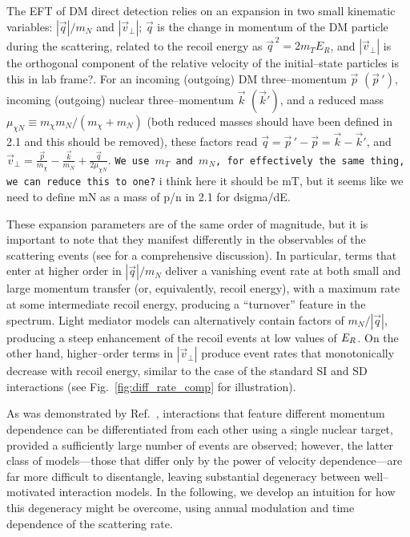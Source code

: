 \documentclass[11pt]{article}
\newcommand{\Fig}[1]{Fig.~\ref{#1}} \newcommand{\Figs}[2]{Figs.~\ref{#1} and \ref{#2}}
\newcommand{\sjwColor}{red}
\newcommand{\sjwtt}[1]{{\color{\sjwColor}\tt #1}}
\newcommand{\vgColor}{magenta}
\newcommand{\vg}[1]{{\color{\vgColor} #1}}
\begin{document}
The EFT of DM direct detection \cite{Fitzpatrick:2012ix, Anand:2013yka} relies on an expansion in two small kinematic variables: $|\vec q|/m_N$ and $|\vec v_\perp|$; $\vec q$ is the change in momentum of the DM particle during the scattering, related to the recoil energy as $\vec{q}^{\, 2} =2m_TE_R$, and $|\vec v_\perp|$ is the orthogonal component of the relative velocity of the initial--state particles \vg{is this in lab frame?}. For an incoming (outgoing) DM three--momentum $\vec p$ $(\vec p\,')$, incoming (outgoing) nuclear three--momentum $\vec k$ $(\vec k')$, and a reduced mass $\mu_{\chi N} \equiv m_\chi m_N/(m_\chi +m_N)$ \vg{(both reduced masses should have been defined in 2.1 and this should be removed)}, these factors read $\vec q=\vec p\,'-\vec p=\vec k-\vec k'$, and $\vec v_\perp=\frac{\vec p}{m_\chi}-\frac{\vec k}{m_N}+\frac{\vec q}{2\mu_{\chi N}}$. \sjwtt{We use $m_T$ and $m_N$, for effectively the same thing, we can reduce this to one?}\vg{i think here it should be mT, but it seems like we need to define mN as a mass of p/n in 2.1 for dsigma/dE.}

These expansion parameters are of the same order of magnitude, but it is important to note that they manifest differently in the observables of the scattering events (see \eg \cite{Gluscevic:2015sqa} for a comprehensive discussion). In particular, terms that enter at higher order in $|\vec q|/m_N$ deliver a vanishing event rate at both small and large momentum transfer (or, equivalently, recoil energy), with a maximum rate at some intermediate recoil energy, producing a ``turnover'' feature in the spectrum. Light mediator models can alternatively contain factors of $m_N/|\vec q|$, producing a steep enhancement of the recoil events at low values of $E_R$. On the other hand, higher--order terms in $| \vec v_\perp|$ produce event rates that monotonically decrease with recoil energy, similar to the case of the standard SI and SD interactions (see \Fig{fig:diff_rate_comp} for illustration).

As was demonstrated by Ref.~\cite{Gluscevic:2015sqa}, interactions that feature different momentum dependence can be differentiated from each other using a single nuclear target, provided a sufficiently large number of events are observed; however, the latter class of models---those that differ only by the power of velocity dependence---are far more difficult to disentangle, leaving substantial degeneracy between well--motivated interaction models. In the following, we develop an intuition for how this degeneracy might be overcome, using annual modulation and time dependence of the scattering rate.
\end{document}
